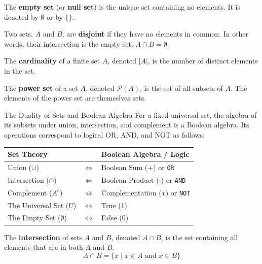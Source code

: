 \begin{definition}
    The \textbf{empty set} (or \textbf{null set}) is the unique set containing no elements. It is denoted by $\emptyset$ or by $\{\}$.
\end{definition}

\begin{definition}
    Two sets, $A$ and $B$, are \textbf{disjoint} if they have no elements in common. In other words, their intersection is the empty set: $A \cap B = \emptyset$.
\end{definition}

\begin{definition}[Cardinality]
    The \textbf{cardinality} of a finite set $A$, denoted $|A|$, is the number of distinct elements in the set.
\end{definition}

\begin{definition}
    The \textbf{power set} of a set $A$, denoted $\mathcal{P}(A)$, is the set of all subsets of $A$. The elements of the power set are themselves sets.
\end{definition}

\begin{custombox}{The Duality of Sets and Boolean Algebra}
    For a fixed universal set, the algebra of its subsets under union, intersection, and complement is a Boolean algebra. Its operations correspond to logical OR, AND, and NOT as follows:
    \begin{center}
    \renewcommand{\arraystretch}{1.3}
    \begin{tabular}{lcl}
        \textbf{Set Theory} & & \textbf{Boolean Algebra / Logic} \\
        \hline
        Union ($\cup$) & $\iff$ & Boolean Sum ($+$) or \texttt{OR} \\
        Intersection ($\cap$) & $\iff$ & Boolean Product ($\cdot$) or \texttt{AND} \\
        Complement ($A^c$) & $\iff$ & Complementation ($\overline{x}$) or \texttt{NOT} \\
        The Universal Set ($U$) & $\iff$ & True (1) \\
        The Empty Set ($\emptyset$) & $\iff$ & False (0) \\
    \end{tabular}
    \end{center}
\end{custombox}

\begin{definition}[Intersection]
    The \textbf{intersection} of sets $A$ and $B$, denoted $A \cap B$, is the set containing all elements that are in both $A$ and $B$.
    \[ A \cap B = \{ x \mid x \in A \text{ and } x \in B \} \]
\end{definition}

